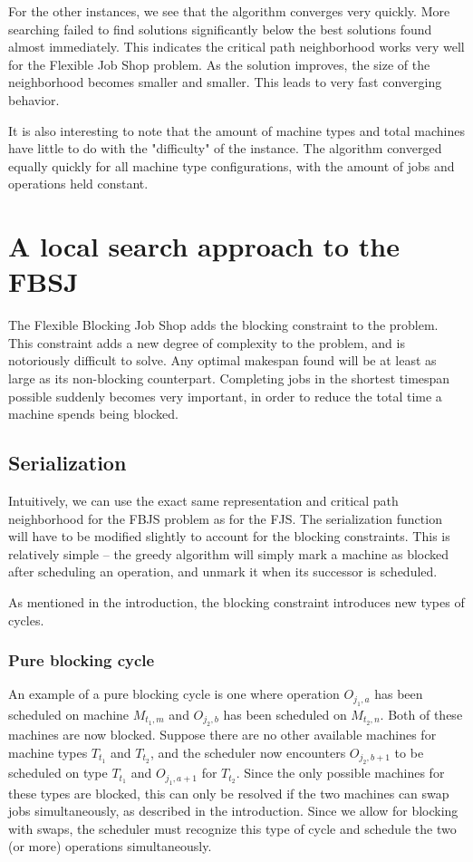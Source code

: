 \documentclass[a4paper,11pt]{article}
\begin{document}
For the other instances, we see that the algorithm converges very quickly. More searching failed to find solutions significantly below the best solutions found almost immediately. This indicates the critical path neighborhood works very well for the Flexible Job Shop problem. As the solution improves, the size of the neighborhood becomes smaller and smaller. This leads to very fast converging behavior.

It is also interesting to note that the amount of machine types and total machines have little to do with the "difficulty" of the instance. The algorithm converged equally quickly for all machine type configurations, with the amount of jobs and operations held constant.

\section{A local search approach to the FBSJ}

The Flexible Blocking Job Shop adds the blocking constraint to the problem. This constraint adds a new degree of complexity to the problem, and is notoriously difficult to solve. Any optimal makespan found will be at least as large as its non-blocking counterpart. Completing jobs in the shortest timespan possible suddenly becomes very important, in order to reduce the total time a machine spends being blocked.

\subsection{Serialization}

Intuitively, we can use the exact same representation and critical path neighborhood for the FBJS problem as for the FJS. The serialization function will have to be modified slightly to account for the blocking constraints. This is relatively simple -- the greedy algorithm will simply mark a machine as blocked after scheduling an operation, and unmark it when its successor is scheduled.

As mentioned in the introduction, the blocking constraint introduces new types of cycles.

\subsubsection{Pure blocking cycle}

An example of a pure blocking cycle is one where operation $O_{j_1,a}$ has been scheduled on machine $M_{t_1,m}$ and $O_{j_2,b}$ has been scheduled on $M_{t_2,n}$. Both of these machines are now blocked. Suppose there are no other available machines for machine types $T_{t_1}$ and $T_{t_2}$, and the scheduler now encounters $O_{j_2,b+1}$ to be scheduled on type $T_{t_1}$ and $O_{j_1,a+1}$ for $T_{t_2}$. Since the only possible machines for these types are blocked, this can only be resolved if the two machines can swap jobs simultaneously, as described in the introduction. Since we allow for blocking with swaps, the scheduler must recognize this type of cycle and schedule the two (or more) operations simultaneously.
\end{document}
